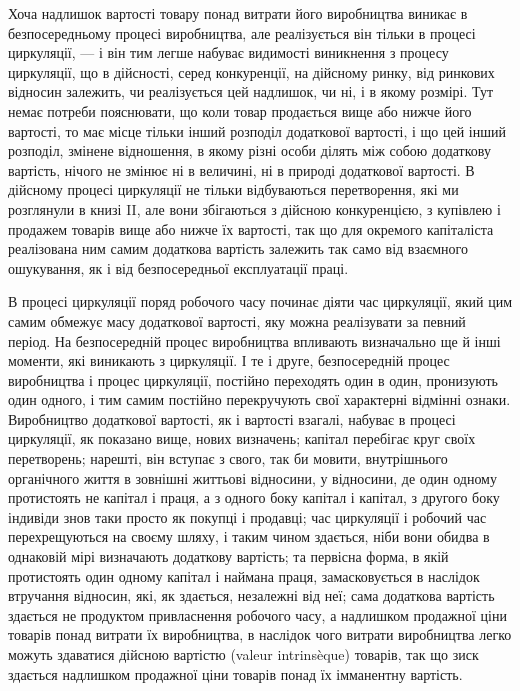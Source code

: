 Хоча надлишок вартості товару понад витрати його виробництва
виникає в безпосередньому процесі виробництва, але реалізується
він тільки в процесі циркуляції, — і він тим легше набуває видимості
виникнення з процесу циркуляції, що в дійсності, серед
конкуренції, на дійсному ринку, від ринкових відносин залежить,
чи реалізується цей надлишок, чи ні, і в якому розмірі. Тут
немає потреби пояснювати, що коли товар продається вище
або нижче його вартості, то має місце тільки інший розподіл
додаткової вартості, і що цей інший розподіл, змінене
відношення, в якому різні особи ділять між собою додаткову вартість,
нічого не змінює ні в величині, ні в природі додаткової
вартості. В дійсному процесі циркуляції не тільки відбуваються
перетворення, які ми розглянули в книзі II, але вони збігаються
з дійсною конкуренцією, з купівлею і продажем товарів вище
або нижче їх вартості, так що для окремого капіталіста реалізована
ним самим додаткова вартість залежить так само від
взаємного ошукування, як і від безпосередньої експлуатації
праці.

В процесі циркуляції поряд робочого часу починає діяти час
циркуляції, який цим самим обмежує масу додаткової вартості,
яку можна реалізувати за певний період. На безпосередній
процес виробництва впливають визначально ще й інші моменти,
які виникають з циркуляції. І те і друге, безпосередній
процес виробництва і процес циркуляції, постійно переходять
один в один, пронизують один одного, і тим самим постійно
перекручують свої характерні відмінні ознаки. Виробництво додаткової
вартості, як і вартості взагалі, набуває в процесі циркуляції,
як показано вище, нових визначень; капітал перебігає
круг своїх перетворень; нарешті, він вступає з свого, так би
мовити, внутрішнього органічного життя в зовнішні життьові
відносини, у відносини, де один одному протистоять не капітал
і праця, а з одного боку капітал і капітал, з другого боку
індивіди знов таки просто як покупці і продавці; час циркуляції
і робочий час перехрещуються на своєму шляху, і таким
чином здається, ніби вони обидва в однаковій мірі визначають
додаткову вартість; та первісна форма, в якій протистоять один
одному капітал і наймана праця, замасковується в наслідок втручання
відносин, які, як здається, незалежні від неї; сама додаткова
вартість здається не продуктом привласнення робочого часу,
а надлишком продажної ціни товарів понад витрати їх виробництва,
в наслідок чого витрати виробництва легко можуть здаватися
дійсною вартістю (valeur intrinsèque) товарів, так що зиск
здається надлишком продажної ціни товарів понад їх імманентну
вартість.

